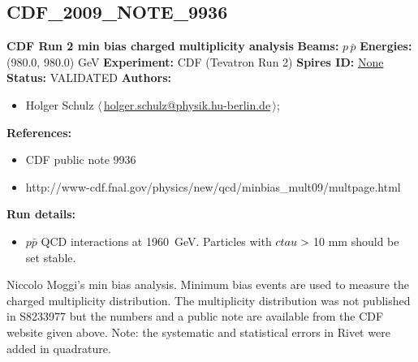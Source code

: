 \clearpage


\clearpage

\subsection{CDF\_2009\_NOTE\_9936}
\textbf{CDF Run 2 min bias charged multiplicity analysis}\newline
\textbf{Beams:} $p$\,$\bar{p}$ \newline
\textbf{Energies:} (980.0, 980.0) GeV \newline
\textbf{Experiment:} CDF (Tevatron Run 2) \newline
\textbf{Spires ID:} \href{http://www.slac.stanford.edu/spires/find/hep/www?rawcmd=key+None}{None}\newline
\textbf{Status:} VALIDATED\newline
\textbf{Authors:}
\begin{itemize}
  \item Holger Schulz $\langle\,$\href{mailto:holger.schulz@physik.hu-berlin.de}{holger.schulz@physik.hu-berlin.de}$\,\rangle$;
\end{itemize}
\textbf{References:}
\begin{itemize}
  \item CDF public note 9936
  \item http://www-cdf.fnal.gov/physics/new/qcd/minbias_mult09/multpage.html
\end{itemize}
\textbf{Run details:}
\begin{itemize}

  \item $p\bar{p}$ QCD interactions at 1960~GeV. Particles with $c \\tau > {}$10 mm should be set stable.\end{itemize}

\noindent Niccolo Moggi's min bias analysis. Minimum bias events are used to measure the charged multiplicity distribution. The multiplicity distribution was not published in S8233977 but the numbers and a public note are available from the CDF website given above. Note: the systematic and statistical errors in Rivet were added in quadrature.

\clearpage


\clearpage

